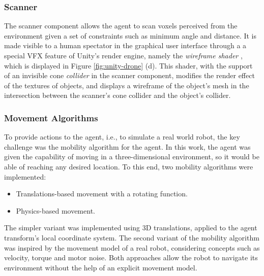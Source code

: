 \subsubsection{Scanner}
The scanner component allows the agent to scan voxels perceived from the environment given a set of constraints such as minimum angle and distance. It is made visible to a human spectator in the graphical user interface through a a special VFX feature of Unity's render engine, namely the \textit{wireframe shader} \cite{unity-asset-store}, which is displayed in Figure \ref{fig:unity-drone} (d). This shader, with the support of an invisible cone \textit{collider} \cite{unity2021} in the scanner component, modifies the render effect of the textures of objects, and displays a wireframe of the object's mesh in the intersection between the scanner's cone collider and the object's collider.

\subsubsection{Movement Algorithms}
To provide actions to the agent, i.e., to simulate a real world robot, the key challenge was the mobility algorithm for the agent. In this work, the agent was given the capability of moving in a three-dimensional environment, so it would be able of reaching any desired location.
To this end, two mobility algorithms were implemented:
\begin{itemize}
    \item Translations-based movement with a rotating function.
    \item Physics-based movement.
\end{itemize}
The simpler variant was implemented using 3D translations, applied to the agent transform's local coordinate system.
The second variant of the mobility algorithm was inspired by the movement model of a real robot, considering concepts such as velocity, torque and motor noise. Both approaches allow the robot to navigate its environment without the help of an explicit movement model.

